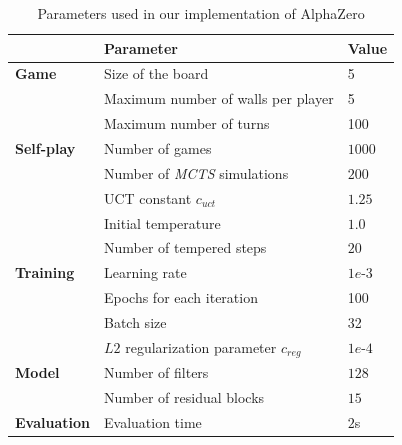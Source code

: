 \documentclass[journal, a4paper]{IEEEtran}
\begin{document}
    \begin{table}[h]
        \centering
        \begin{tabular}{lll}
            \toprule
            & Parameter & Value \\
            \midrule
            \textbf{Game} & Size of the board & 5 \\
            & Maximum number of walls per player & 5 \\
            & Maximum number of turns & 100 \\
            \midrule
            \textbf{Self-play} & Number of games & $1000$ \\
            & Number of \textit{MCTS} simulations & $200$ \\
            & UCT constant $c_{uct}$ & $1.25$ \\
            & Initial temperature & $1.0$ \\
            & Number of tempered steps & $20$ \\
            \midrule
            \textbf{Training} & Learning rate & $1e$-$3$\\
            & Epochs for each iteration & 100 \\
            &Batch size & 32 \\
            &$L2$ regularization parameter $c_{reg}$ & $1e$-$4$ \\
            \midrule
            \textbf{Model} & Number of filters & $128$\\
            & Number of residual blocks & $15$ \\
            \midrule
            \textbf{Evaluation} & Evaluation time & $2$s \\
            \bottomrule
        \end{tabular}
    \caption{Parameters used in our implementation of AlphaZero}
    \label{tab:alphazero-params}
    \end{table}
\end{document}
